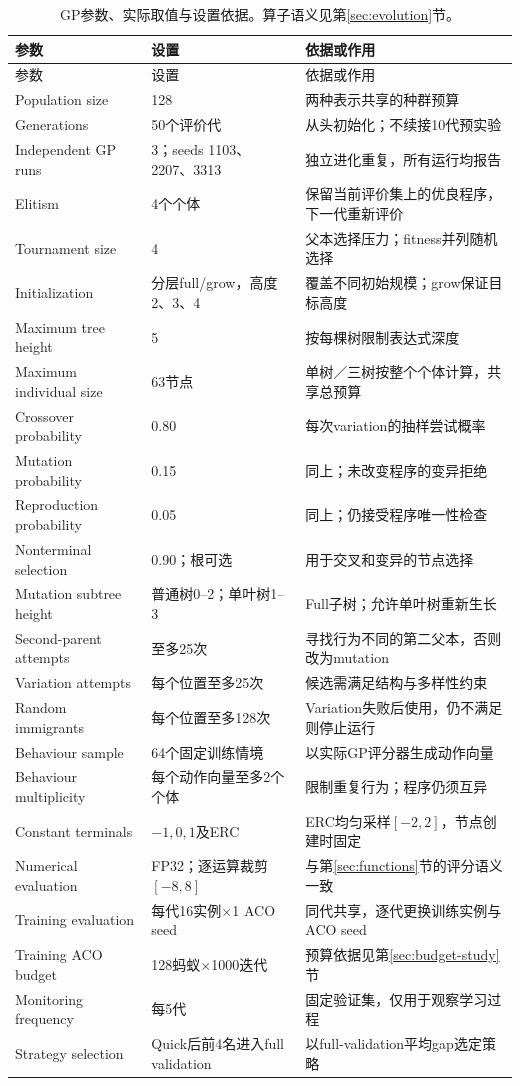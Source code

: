 \begin{longtable}{@{}L{35mm}L{32mm}L{49mm}@{}}
\caption{GP参数、实际取值与设置依据。算子语义见第\ref{sec:evolution}节。}\label{tab:gp-parameters}\\
\toprule 参数 & 设置 & 依据或作用\\ \midrule\endfirsthead
\toprule 参数 & 设置 & 依据或作用\\ \midrule\endhead
Population size & 128 & 两种表示共享的种群预算\\
Generations & 50个评价代 & 从头初始化；不续接10代预实验\\
Independent GP runs & 3；seeds 1103、2207、3313 & 独立进化重复，所有运行均报告\\
Elitism & 4个个体 & 保留当前评价集上的优良程序，下一代重新评价\\
Tournament size & 4 & 父本选择压力；fitness并列随机选择\\
Initialization & 分层full/grow，高度2、3、4 & 覆盖不同初始规模；grow保证目标高度\\
Maximum tree height & 5 & 按每棵树限制表达式深度\\
Maximum individual size & 63节点 & 单树／三树按整个个体计算，共享总预算\\
Crossover probability & 0.80 & 每次variation的抽样尝试概率\\
Mutation probability & 0.15 & 同上；未改变程序的变异拒绝\\
Reproduction probability & 0.05 & 同上；仍接受程序唯一性检查\\
Nonterminal selection & 0.90；根可选 & 用于交叉和变异的节点选择\\
Mutation subtree height & 普通树0--2；单叶树1--3 & Full子树；允许单叶树重新生长\\
Second-parent attempts & 至多25次 & 寻找行为不同的第二父本，否则改为mutation\\
Variation attempts & 每个位置至多25次 & 候选需满足结构与多样性约束\\
Random immigrants & 每个位置至多128次 & Variation失败后使用，仍不满足则停止运行\\
Behaviour sample & 64个固定训练情境 & 以实际GP评分器生成动作向量\\
Behaviour multiplicity & 每个动作向量至多2个个体 & 限制重复行为；程序仍须互异\\
Constant terminals & $-1,0,1$及ERC & ERC均匀采样$[-2,2]$，节点创建时固定\\
Numerical evaluation & FP32；逐运算裁剪$[-8,8]$ & 与第\ref{sec:functions}节的评分语义一致\\
Training evaluation & 每代16实例$\times$1 ACO seed & 同代共享，逐代更换训练实例与ACO seed\\
Training ACO budget & 128蚂蚁$\times$1000迭代 & 预算依据见第\ref{sec:budget-study}节\\
Monitoring frequency & 每5代 & 固定验证集，仅用于观察学习过程\\
Strategy selection & Quick后前4名进入full validation & 以full-validation平均gap选定策略\\
\bottomrule
\end{longtable}

